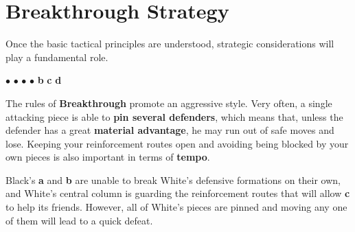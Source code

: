 \documentclass[a4paper,12pt]{article}
\newcommand{\BT}{\textbf{Breakthrough}\xspace}  %
\begin{document}

    \section{\BT Strategy}

    Once the basic tactical principles are understood, strategic considerations will play a fundamental role.

    \begin{minipage}[c]{0.36\linewidth}
        \begin{center}
            \begin{othelloboardnorefs}{0.75}
                \annotationsfirstrow	{} {} {} {} {} {} {} {}
                \annotationssecondrow	{} {$\bullet$} {} {} {} {$\bullet$} {} {}
                 {} {$\bullet$} {} {$\bullet$} {} {} {{\sffamily \textbf{b}}}
                \annotationsfourthrow	{} {} {} {{\sffamily \textbf{c}}} {} {} {} {}
                \annotationsfifthrow	{} {} {} {} {} {} {} {}
                \annotationssixthrow	{} {} {} {} {} {} {} {}
                \annotationsseventhrow	{} {} {} {} {} {} {} {}
                \annotationseighthrow	{} {} {} {} {} {} {} {{\sffamily \textbf{d}}}
            \end{othelloboardnorefs}
        \end{center}
    \end{minipage}
    \hfill
    \begin{minipage}[c]{0.62\linewidth}
        The rules of \BT promote an aggressive style.  Very often, a single attacking piece is able to \textbf{pin several defenders}, which means that, unless the defender has a great \textbf{material advantage}, he may run out of safe moves and lose.  Keeping your reinforcement routes open and avoiding being blocked by your own pieces is also important in terms of \textbf{tempo}.

        Black's \textbf{a} and \textbf{b} are unable to break White's defensive formations on their own, and White's central column is guarding the reinforcement routes that will allow \textbf{c} to help its friends.  However, all of White's pieces are pinned and moving any one of them will lead to a quick defeat.
    \end{minipage}
\end{document}
